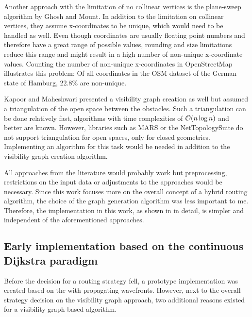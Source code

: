 		Another approach with the limitation of no collinear vertices is the plane-sweep algorithm by Ghosh and Mount\cite{ghosh-output-sensitive-vgraph}.
		In addition to the limitation on collinear vertices, they assume x-coordinates to be unique, which would need to be handled as well.
		Even though coordinates are usually floating point numbers and therefore have a great range of possible values, rounding and size limitations reduce this range and might result in a high number of non-unique x-coordinate values.
		Counting the number of non-unique x-coordinates in OpenStreetMap illustrates this problem:
		Of all coordinates in the OSM dataset of the German state of Hamburg, 22.8\% are non-unique.
		
		Kapoor and Maheshwari presented a visibility graph creation as well\cite{kapoor-shortest-path-vgraph} but assumed a triangulation of the open space between the obstacles.
		Such a triangulation can be done relatively fast, algorithms with time complexities of $\mathcal{O}(n \log{n})$ and better are known\cite[58-60]{de-berg-computational-geometry}.
		However, libraries such as MARS or the NetTopologySuite do not support triangulation for open spaces, only for closed geometries.
		Implementing an algorithm for this task would be needed in addition to the visibility graph creation algorithm.
		
		All approaches from the literature would probably work but preprocessing, restrictions on the input data or adjustments to the approaches would be necessary.
		Since this work focuses more on the overall concept of a hybrid routing algorithm, the choice of the graph generation algorithm was less important to me.
		Therefore, the implementation in this work, as shown in  in detail, is simpler and independent of the aforementioned approaches.
		
	\subsection{Early implementation based on the continuous Dijkstra paradigm}
		
		Before the decision for a routing strategy fell, a prototype implementation was created based on the  with propagating wavefronts.
		However, next to the overall strategy decision on the visibility graph approach, two additional reasons existed for a visibility graph-based algorithm.
		
